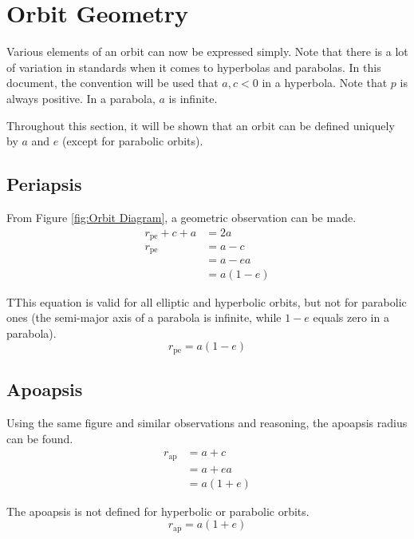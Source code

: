 \documentclass{article}
\begin{document}
\pagebreak
\section{Orbit Geometry}\label{sec:Orbit geoemtry}

Various elements of an orbit can now be expressed simply. Note that there is a lot of variation in standards when it comes to hyperbolas and parabolas. In this document, the convention will be used that $a, c<0$ in a hyperbola. Note that $p$ is always positive. In a parabola, $a$ is infinite.

Throughout this section, it will be shown that an orbit can be defined uniquely by $a$ and $e$ (except for parabolic orbits).

\bigskip\bigskip
\subsection{Periapsis}\label{sec:Periapsis Geometric}

From Figure \ref{fig:Orbit Diagram}, a geometric observation can be made.
\begin{align*}
    r_\text{pe}+c+a & = 2a     \\
    r_\text{pe}     & =a-c     \\
                    & =a-ea    \\
                    & = a(1-e)
\end{align*}

TThis equation is valid for all elliptic and hyperbolic orbits, but not for parabolic ones (the semi-major axis of a parabola is infinite, while $1-e$ equals zero in a parabola).
\begin{equation}\label{Periapsis Radius Geometric}
    r_\text{pe}=a(1-e)
\end{equation}

\bigskip\bigskip
\subsection{Apoapsis}\label{sec:Apoapsis Geometric}

Using the same figure and similar observations and reasoning, the apoapsis radius can be found.
\begin{align*}
    r_\text{ap} & = a+c   \\
                & =a+ea   \\
                & =a(1+e)
\end{align*}

The apoapsis is not defined for hyperbolic or parabolic orbits.
\begin{equation}\label{Apoapsis Radius Geometric}
    r_\text{ap}=a(1+e)
\end{equation}
\end{document}

